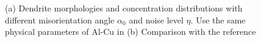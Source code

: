 \documentclass[final,times]{elsarticle}
\numberwithin{equation}{section}
\begin{document}
 \begin{figure}[!ht]
 \centering
     \hfill
     
     \caption{(a) Dendrite morphologies and concentration distributions with different misorientation angle $\alpha_0$ and noise level $\eta$. Use the same physical parameters of Al-Cu in \cite{Takaki2014}(b) Comparison with the reference \cite{Takaki2014}}
     \label{fig:Ech}
   \end{figure}
   














\end{document}
